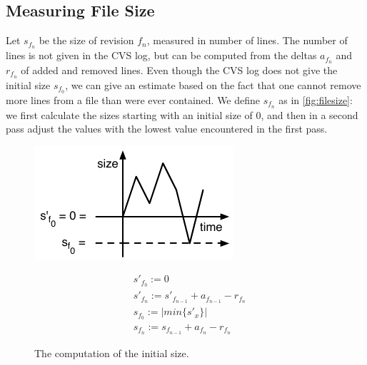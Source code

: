 \subsection{Measuring File Size}

Let $s_{f_n}$ be the size of revision $f_n$, measured in number of lines. The number of lines is not given in the CVS log, but can be computed from the deltas $a_{f_n}$ and $r_{f_n}$ of added and removed lines. Even though the CVS log does not give the initial size $s_{f_0}$, we can give an estimate based on the fact that one cannot remove more lines from a file than were ever contained. We define $s_{f_n}$ as in \autoref{fig:filesize}: we first calculate the sizes starting with an initial size of 0, and then in a second pass adjust the values with the lowest value encountered in the first pass.

\begin{figure}[htbp]
\begin{minipage}[c]{.45\linewidth}
\includegraphics[width=1.2\linewidth]{fig/chronia-minimum}
 \end{minipage}
 \hfill
 \begin{minipage}[c]{.5\linewidth}
\begin{eqnarray}
& s'_{f_0} := 0 \nonumber \\
& s'_{f_n} := s'_{f_{n-1}} + a_{f_{n-1}} - r_{f_n} \nonumber  \\
& s_{f_0} := \vert min \{ s'_x \} \vert \nonumber \\
& s_{f_n} := s_{f_{n-1}} + a_{f_n} - r_{f_n} \nonumber
 \end{eqnarray}
 \end{minipage}
\caption{The computation of the initial size.}
\label{fig:filesize}
\end{figure}

